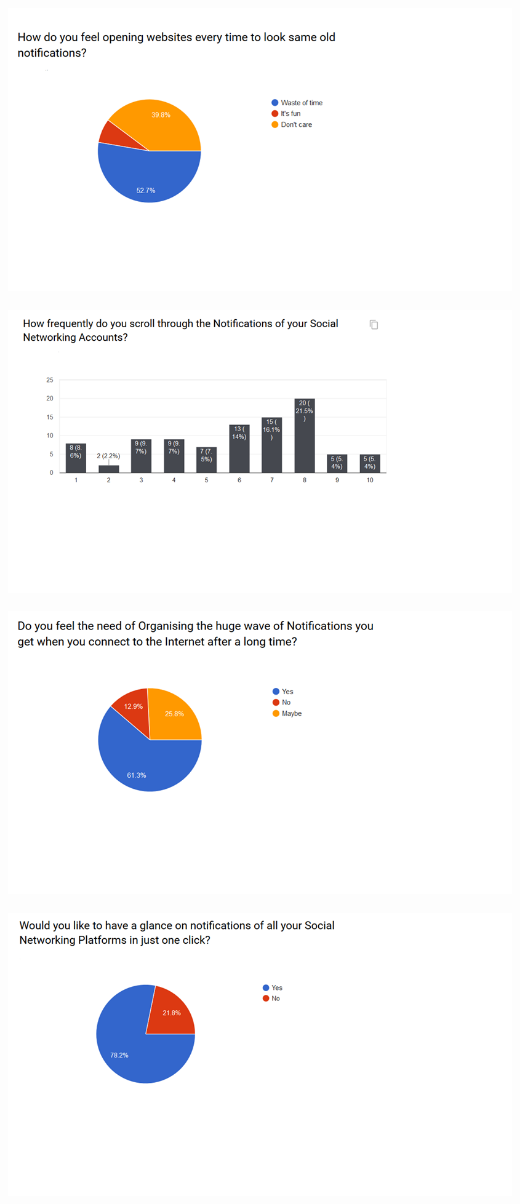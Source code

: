\documentclass[12pt]{article}
\begin{document}
  
  \includegraphics[width=\linewidth]{srs2.png}
  
  \includegraphics[width=\linewidth]{srs3.png}
  
  \includegraphics[width=\linewidth]{srs4.png}
  
  \includegraphics[width=\linewidth]{srs5.png}
  
\end{document}
